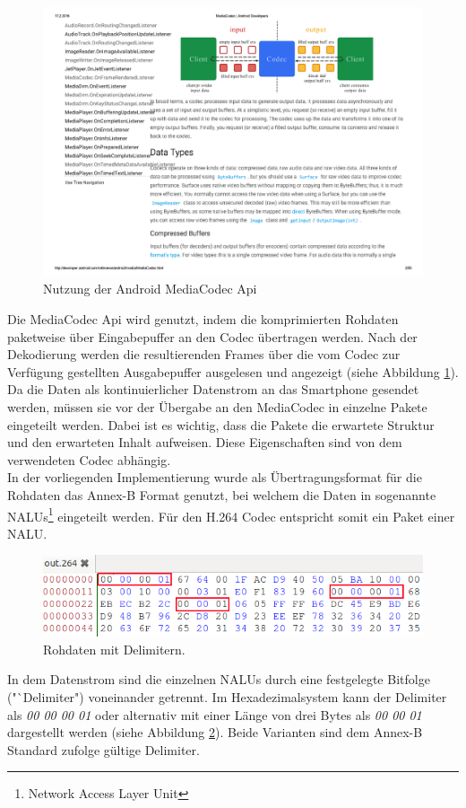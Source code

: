 \begin{figure}[h]
	\includegraphics{Bilder/BildakquiseUndDatenaufbereitung/mediacodec.pdf}
	\caption[Nutzung der Android MediaCodec Api]{Nutzung der Android MediaCodec Api\footnotemark}
	\label{fig:media_codec}
\end{figure}
Die MediaCodec Api wird genutzt, indem die komprimierten Rohdaten paketweise über Eingabepuffer an den Codec übertragen werden. Nach der Dekodierung werden die resultierenden Frames über die vom Codec zur Verfügung gestellten Ausgabepuffer ausgelesen und angezeigt (siehe Abbildung \ref{fig:media_codec}).\\
Da die Daten als kontinuierlicher Datenstrom an das Smartphone gesendet werden, müssen sie vor der Übergabe an den MediaCodec in einzelne Pakete eingeteilt werden. Dabei ist es wichtig, dass die Pakete die erwartete Struktur und den erwarteten Inhalt aufweisen. Diese Eigenschaften sind von dem verwendeten Codec abhängig.\\
In der vorliegenden Implementierung wurde als Übertragungsformat für die Rohdaten das Annex-B Format genutzt, bei welchem die Daten in sogenannte NALUs\footnote{Network Access Layer Unit} eingeteilt werden. Für den H.264 Codec entspricht somit ein Paket einer NALU.\\
\begin{figure}[H]
	\includegraphics{Bilder/BildakquiseUndDatenaufbereitung/NALUs.png}
	\caption{Rohdaten mit Delimitern.}
	\label{fig:nalus_delimiter}
\end{figure}
In dem Datenstrom sind die einzelnen NALUs durch eine festgelegte Bitfolge ("`Delimiter") voneinander getrennt. Im Hexadezimalsystem kann der Delimiter als \textit{00 00 00 01} oder alternativ mit einer Länge von drei Bytes als \textit{00 00 01} dargestellt werden (siehe Abbildung \ref{fig:nalus_delimiter}). Beide Varianten sind dem Annex-B Standard zufolge gültige Delimiter.\\

